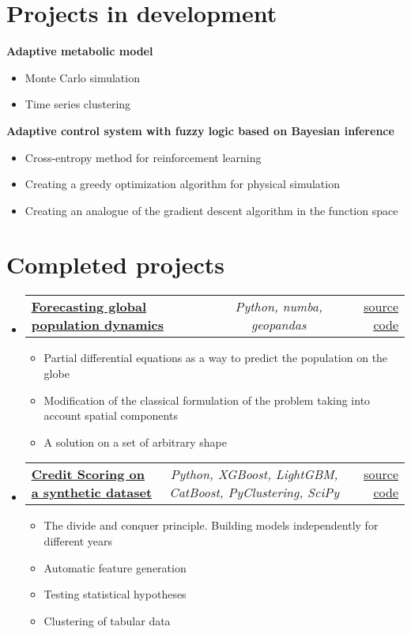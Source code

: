 \documentclass[a4paper,11pt]{article}
\makeatletter
\newcommand{\resumeItem}[1]{
  \item\small{#1}
}
\newcommand{\resumeItemListStart}{\begin{itemize}[rightmargin=0.11in]}
\newcommand{\resumeItemListEnd}{\end{itemize}}
\newcommand{\resumeTrioHeading}[3]{
  \item\small{
    \begin{tabular*}{0.96\textwidth}[t]{
      l@{\extracolsep{\fill}}c@{\extracolsep{\fill}}r
    }
      \textbf{#1} & \textit{#2} & #3
    \end{tabular*}
  }
}
\newcommand{\resumeHeadingListStart}{
  \begin{itemize}[leftmargin=0.15in, label={}]
}
\newcommand{\resumeHeadingListEnd}{\end{itemize}}
\makeatother
\begin{document}
\section{Projects in development}
\resumeHeadingListStart{}
\textbf{Adaptive metabolic model}
\resumeHeadingListEnd{}

\resumeItemListStart{}
\resumeItem{Monte Carlo simulation}
\resumeItem{Time series clustering}
\resumeItemListEnd{}


\resumeHeadingListStart{}
\textbf{Adaptive control system with fuzzy logic based on Bayesian inference}
\resumeHeadingListEnd{}

\resumeItemListStart{}
\resumeItem{Cross-entropy method for reinforcement learning}
\resumeItem{Creating a greedy optimization algorithm for physical simulation}
\resumeItem{Creating an analogue of the gradient descent algorithm in the function space}
\resumeItemListEnd{}


\section{Completed projects}

  \resumeHeadingListStart{}
        \resumeTrioHeading{\href{https://github.com/RepnikovPavel/FinancialData}{\uline{Forecasting global population dynamics}}}{Python, numba, geopandas}{\href{https://github.com/RepnikovPavel/GlobalDynamics}{\uline{source code}}}
    \resumeItemListStart{}
    \resumeItem{Partial differential equations as a way to predict the population on the globe}
    \resumeItem{Modification of the classical formulation of the problem taking into account spatial components}
    \resumeItem{A solution on a set of arbitrary shape}
    \resumeItemListEnd{}
    \resumeHeadingListEnd

  \resumeHeadingListStart{}
        \resumeTrioHeading{\href{https://github.com/RepnikovPavel/FinancialData}{\uline{Credit Scoring on a synthetic dataset}}}{Python, XGBoost, LightGBM, CatBoost, PyClustering, SciPy}{\href{https://github.com/RepnikovPavel/FinancialData}{\uline{source code}}}
    \resumeItemListStart{}
    \resumeItem{The divide and conquer principle. Building models independently for different years}
    \resumeItem{Automatic feature generation}
    \resumeItem{Testing statistical hypotheses}
    \resumeItem{Clustering of tabular data}
    \resumeItemListEnd{}
    \resumeHeadingListEnd
    
\end{document}
